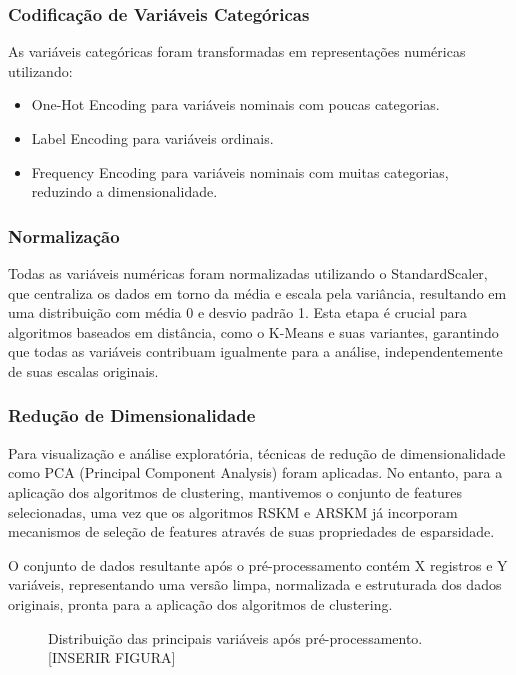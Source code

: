 \documentclass[conference]{IEEEtran}
\begin{document}
\subsubsection{Codificação de Variáveis Categóricas}
As variáveis categóricas foram transformadas em representações numéricas utilizando:

\begin{itemize}
    \item One-Hot Encoding para variáveis nominais com poucas categorias.
    \item Label Encoding para variáveis ordinais.
    \item Frequency Encoding para variáveis nominais com muitas categorias, reduzindo a dimensionalidade.
\end{itemize}

\subsubsection{Normalização}
Todas as variáveis numéricas foram normalizadas utilizando o StandardScaler, que centraliza os dados em torno da média e escala pela variância, resultando em uma distribuição com média 0 e desvio padrão 1. Esta etapa é crucial para algoritmos baseados em distância, como o K-Means e suas variantes, garantindo que todas as variáveis contribuam igualmente para a análise, independentemente de suas escalas originais.

\subsubsection{Redução de Dimensionalidade}
Para visualização e análise exploratória, técnicas de redução de dimensionalidade como PCA (Principal Component Analysis) foram aplicadas. No entanto, para a aplicação dos algoritmos de clustering, mantivemos o conjunto de features selecionadas, uma vez que os algoritmos RSKM e ARSKM já incorporam mecanismos de seleção de features através de suas propriedades de esparsidade.

O conjunto de dados resultante após o pré-processamento contém X registros e Y variáveis, representando uma versão limpa, normalizada e estruturada dos dados originais, pronta para a aplicação dos algoritmos de clustering.

\begin{figure}[!t]
\centering
\caption{Distribuição das principais variáveis após pré-processamento. [INSERIR FIGURA]}
\label{fig:preprocessing}
\end{figure}
\end{document}
